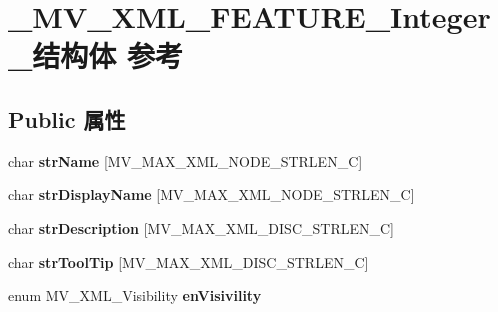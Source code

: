 \hypertarget{struct___m_v___x_m_l___f_e_a_t_u_r_e___integer__}{}\section{\+\_\+\+M\+V\+\_\+\+X\+M\+L\+\_\+\+F\+E\+A\+T\+U\+R\+E\+\_\+\+Integer\+\_\+结构体 参考}
\label{struct___m_v___x_m_l___f_e_a_t_u_r_e___integer__}
\subsection*{Public 属性}
\begin{DoxyCompactItemize}
\item 
\mbox{\label{struct___m_v___x_m_l___f_e_a_t_u_r_e___integer___aa5907f76c6f9fbf8651189bbdda62e5e}} 
char {\bfseries str\+Name} \mbox{[}M\+V\+\_\+\+M\+A\+X\+\_\+\+X\+M\+L\+\_\+\+N\+O\+D\+E\+\_\+\+S\+T\+R\+L\+E\+N\+\_\+C\mbox{]}
\item 
\mbox{\label{struct___m_v___x_m_l___f_e_a_t_u_r_e___integer___a1e86df0769aa0ce668e434b7e8f20f6e}} 
char {\bfseries str\+Display\+Name} \mbox{[}M\+V\+\_\+\+M\+A\+X\+\_\+\+X\+M\+L\+\_\+\+N\+O\+D\+E\+\_\+\+S\+T\+R\+L\+E\+N\+\_\+C\mbox{]}
\item 
\mbox{\label{struct___m_v___x_m_l___f_e_a_t_u_r_e___integer___aff4b14f95a49b480b4d4d78f408372a7}} 
char {\bfseries str\+Description} \mbox{[}M\+V\+\_\+\+M\+A\+X\+\_\+\+X\+M\+L\+\_\+\+D\+I\+S\+C\+\_\+\+S\+T\+R\+L\+E\+N\+\_\+C\mbox{]}
\item 
\mbox{\label{struct___m_v___x_m_l___f_e_a_t_u_r_e___integer___a644663321dc2ed00e9d0b0db4eafacc6}} 
char {\bfseries str\+Tool\+Tip} \mbox{[}M\+V\+\_\+\+M\+A\+X\+\_\+\+X\+M\+L\+\_\+\+D\+I\+S\+C\+\_\+\+S\+T\+R\+L\+E\+N\+\_\+C\mbox{]}
\item 
\mbox{\label{struct___m_v___x_m_l___f_e_a_t_u_r_e___integer___a0cbc2998c070052247066b23484b0fc2}} 
enum M\+V\+\_\+\+X\+M\+L\+\_\+\+Visibility {\bfseries en\+Visivility}

\end{DoxyCompactItemize}
